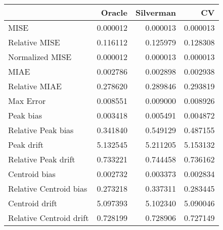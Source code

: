 \begin{tabular}{lrrr}
  \hline
 & Oracle & Silverman & CV \\ 
  \hline
MISE & 0.000012 & 0.000013 & 0.000013 \\ 
  Relative MISE & 0.116112 & 0.125979 & 0.128308 \\ 
  Normalized MISE & 0.000012 & 0.000013 & 0.000013 \\ 
  MIAE & 0.002786 & 0.002898 & 0.002938 \\ 
  Relative MIAE & 0.278620 & 0.289846 & 0.293819 \\ 
  Max Error & 0.008551 & 0.009000 & 0.008926 \\ 
  Peak bias & 0.003418 & 0.005491 & 0.004872 \\ 
  Relative Peak bias & 0.341840 & 0.549129 & 0.487155 \\ 
  Peak drift & 5.132545 & 5.211205 & 5.153132 \\ 
  Relative Peak drift & 0.733221 & 0.744458 & 0.736162 \\ 
  Centroid bias & 0.002732 & 0.003373 & 0.002834 \\ 
  Relative Centroid bias & 0.273218 & 0.337311 & 0.283445 \\ 
  Centroid drift & 5.097393 & 5.102340 & 5.090046 \\ 
  Relative Centroid drift & 0.728199 & 0.728906 & 0.727149 \\ 
   \hline
\end{tabular}
